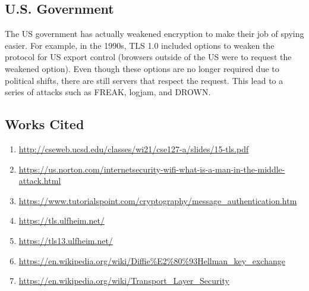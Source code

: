 \documentclass[11pt]{article} %
\begin{document}
\subsection{U.S. Government}
{\parindent0pt The US government has actually 
weakened encryption to make their job of spying easier. For example, in the 
1990s, TLS 1.0 included options to weaken the protocol for US export control 
(browsers outside of the US were to request the weakened option). Even though 
these options are no longer required due to political shifts, there are still 
servers that respect the request. This lead to a series of attacks such as 
FREAK, logjam, and DROWN.}

\newpage
\subsection{Works Cited}

\begin{enumerate}
\item \url{http://cseweb.ucsd.edu/classes/wi21/cse127-a/slides/15-tls.pdf}
\item \url{https://us.norton.com/internetsecurity-wifi-what-is-a-man-in-the-middle-attack.html}
\item \url{https://www.tutorialspoint.com/cryptography/message_authentication.htm}
\item \url{https://tls.ulfheim.net/}
\item \url{https://tls13.ulfheim.net/}
\item \url{https://en.wikipedia.org/wiki/Diffie%E2%80%93Hellman_key_exchange}
\item \url{https://en.wikipedia.org/wiki/Transport_Layer_Security}
\end{enumerate}
\end{document}

